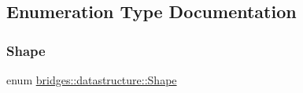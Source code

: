\subsection{Enumeration Type Documentation}
\mbox{\label{namespacebridges_1_1datastructure_a3408f5f44d9c6062e5f3adb7e1bbb7f0}} 
\subsubsection{\texorpdfstring{Shape}{Shape}}
{\footnotesize\ttfamily enum \mbox{\hyperlink{namespacebridges_1_1datastructure_a3408f5f44d9c6062e5f3adb7e1bbb7f0}{bridges\+::datastructure\+::\+Shape}}}


